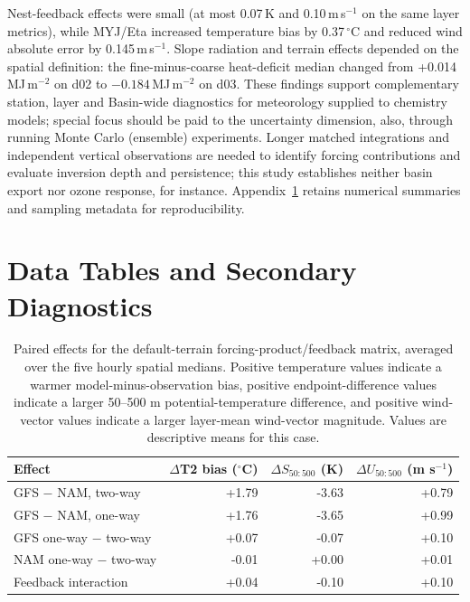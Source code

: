 \documentclass[air,article,submit,moreauthors]{Definitions/mdpi}
\begin{document}
Nest-feedback effects were small (at most 0.07\,K and 0.10\,m\,s$^{-1}$ on the same layer metrics), while MYJ/Eta increased temperature bias by 0.37\,$^{\circ}$C and reduced wind absolute error by 0.145\,m\,s$^{-1}$.
Slope radiation and terrain effects depended on the spatial definition: the fine-minus-coarse heat-deficit median changed from +0.014\,MJ\,m$^{-2}$ on d02 to $-0.184$\,MJ\,m$^{-2}$ on d03.
These findings support complementary station, layer and Basin-wide diagnostics for meteorology supplied to chemistry models; special focus should be paid to the uncertainty dimension, also, through running Monte Carlo (ensemble) experiments.
Longer matched integrations and independent vertical observations are needed to identify forcing contributions and evaluate inversion depth and persistence; this study establishes neither basin export nor ozone response, for instance.
Appendix~\ref{app:v3-data} retains numerical summaries and sampling metadata for reproducibility.

\appendixstart
\appendix
\section{Data Tables and Secondary Diagnostics}
\label{app:v3-data}

\begin{table}[H]
\caption{Paired effects for the default-terrain forcing-product/feedback matrix, averaged over the five hourly spatial medians.
Positive temperature values indicate a warmer model-minus-observation bias, positive endpoint-difference values indicate a larger 50--500 m potential-temperature difference, and positive wind-vector values indicate a larger layer-mean wind-vector magnitude.
Values are descriptive means for this case.}
\label{tab:v3-effects}
\centering
\begin{tabular}{lrrr}
\toprule
Effect & $\Delta$T2 bias ($^{\circ}$C) & $\Delta S_{50:500}$ (K) & $\Delta U_{50:500}$ (m s$^{-1}$) \\
\midrule
GFS $-$ NAM, two-way & +1.79 & -3.63 & +0.79 \\
GFS $-$ NAM, one-way & +1.76 & -3.65 & +0.99 \\
GFS one-way $-$ two-way & +0.07 & -0.07 & +0.10 \\
NAM one-way $-$ two-way & -0.01 & +0.00 & +0.01 \\
Feedback interaction & +0.04 & -0.10 & +0.10 \\
\bottomrule
\end{tabular}
\end{table}
\end{document}
